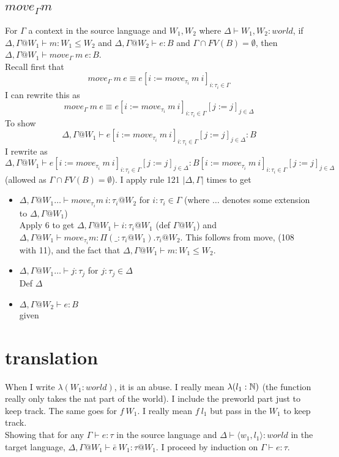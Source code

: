 \documentclass{article}
\begin{document}
\subsection*{$move_{\Gamma} m$}
For $\Gamma$ a context in the source language and $W_1, W_2$ where $\Delta \vdash W_1, W_2 : world$, if  $\Delta, \Gamma@W_1 \vdash m: W_1 \leq W_2$ and $\Delta, \Gamma@W_2 \vdash e : B$ and 
$\Gamma \cap FV(B) = \emptyset$,
then $\Delta, \Gamma @ W_1 \vdash move_{\Gamma} \:m \:e : B$.\\
Recall first that \[move_{\Gamma} \:m \:e \equiv
e[i := move_{\tau_i} \: m\: i]_{i: \tau_i \in \Gamma}
\]
I can rewrite this as 
\[move_{\Gamma} \:m \:e \equiv
e[i := move_{\tau_i} \: m\: i]_{i: \tau_i \in \Gamma}[j := j]_{j \in \Delta}
\]
To show
\[\Delta, \Gamma @ W_1 \vdash e[i := move_{\tau_i} \: m\: i]_{i: \tau_i \in \Gamma}[j := j]_{j \in \Delta} : B\]
I rewrite as
\[\Delta, \Gamma @ W_1 \vdash e[i := move_{\tau_i} \: m\: i]_{i: \tau_i \in \Gamma}[j := j]_{j \in \Delta} : B[i := move_{\tau_i} \: m\: i]_{i: \tau_i \in \Gamma}[j := j]_{j \in \Delta}\]
(allowed as $\Gamma \cap FV(B) = \emptyset$).
I apply rule 121 $|\Delta, \Gamma|$ times to get
\begin{itemize}
    \item $\Delta, \Gamma@W_1 \dots \vdash move_{\tau_i} m\:i : \tau_i @ W_2$ for $i: \tau_i \in \Gamma$
    (where $\dots$ denotes some extension to $\Delta, \Gamma@W_1$)\\
    Apply 6 to get $\Delta, \Gamma@W_1  \vdash i: \tau_i @ W_1$ (def $\Gamma@W_1$) and $\Delta, \Gamma@W_1  \vdash move_{\tau_i} m : \Pi(\_ : \tau_i@W_1).\tau_i @ W_2$. This follows from move, (108 with 11), and the fact that  $\Delta, \Gamma@W_1 \vdash m: W_1 \leq W_2$.
    \item $\Delta, \Gamma@W_1 \dots \vdash j : \tau_j$ for $j : \tau_j \in \Delta$\\
    Def $\Delta$
    \item $\Delta, \Gamma@W_2 \vdash e: B$\\
    given
\end{itemize}

\section*{translation}
When I write $\lambda (W_1: world)$, it is an abuse. I really mean $\lambda (l_1: \mathbb{N})$ (the function really only takes the nat part of the world). I include the preworld part just to keep track. The same goes for $f \: W_1$. I really mean $f \: l_1$ but pass in the $W_1$ to keep track.\\
Showing that for any $\Gamma \vdash e : \tau$ in the source language and $\Delta \vdash  \langle w_1, l_1 \rangle : world$ in the target language,
$\Delta, \Gamma @ W_1 \vdash \bar{e}\: W_1 : \tau @ W_1$. I proceed by induction on $\Gamma \vdash e : \tau$.\\
\end{document}

